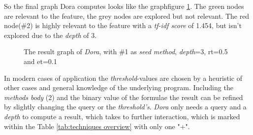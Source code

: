So the final graph Dora computes looks like the graphfigure \ref{dia:dora result}. The green nodes are relevant to the feature, the grey nodes are explored but not relevant. The red node(\#2) is highly relevant to the feature with a \emph{tf-idf score} of 1.454, but isn't explored due to the \textit{depth} of 3.
\begin{figure}[h]
	\centering
	\caption{The result graph of \textit{Dora}, with \#1 as \textit{seed method}, \textit{depth}=3, rt=0.5 and et=0.1}
	\label{dia:dora result}
\end{figure}
 In modern cases of application the \textit{threshold}-values are chosen by a heuristic of other cases and general knowledge of the underlying program. Including the \textit{methods body} (2) and the binary value of the formulae the result can be refined by slightly changing the query or the \textit{threshold's}. \newline
\emph{Dora} only needs a query and a \textit{depth} to compute a result, which takes to further interaction, which is marked within the Table \ref{tab:techniques overview} with only one "+".

